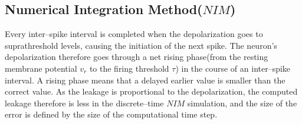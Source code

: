 	\subsection{Numerical Integration Method($NIM$)}
	\label{ssecErrorForNIM}
	Every inter--spike interval is completed when the depolarization goes to suprathreshold levels, causing the initiation of the next spike. %
	The neuron's depolarization therefore goes through a net rising phase(from the resting membrane potential $v_r$ to the firing threshold $\tau$) in the course of an inter--spike interval. 
	A rising phase means that a delayed earlier value is smaller than the correct value. 
	As the leakage is proportional to the depolarization, the computed leakage therefore is less in the discrete--time $NIM$ simulation,
		and the size of the error is defined by the size of the computational time step.
